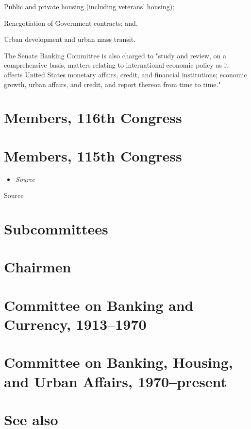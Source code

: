 Public and private housing (including veterans' housing);

Renegotiation of Government contracts; and,

Urban development and urban mass transit.

The Senate Banking Committee is also charged to "study and review, on a
comprehensive basis, matters relating to international economic policy
as it affects United States monetary affairs, credit, and financial
institutions; economic growth, urban affairs, and credit, and report
thereon from time to time."

\section{Members, 116th Congress}\label{members-116th-congress}

\section{Members, 115th Congress}\label{members-115th-congress}

\begin{itemize}
\item
  \emph{Source}
\end{itemize}

Source

\section{Subcommittees}\label{subcommittees}

\section{Chairmen}\label{chairmen}

\section{Committee on Banking and Currency,
1913--1970}\label{committee-on-banking-and-currency-19131970}

\section{Committee on Banking, Housing, and Urban Affairs,
1970--present}\label{committee-on-banking-housing-and-urban-affairs-1970present}

\section{See also}\label{see-also}

